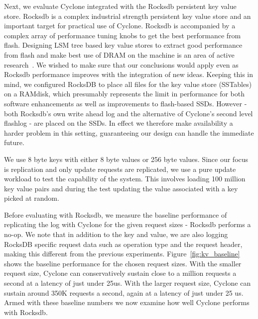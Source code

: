\documentclass[pageno]{jpaper}
\begin{document}
Next, we evaluate Cyclone integrated with the Rocksdb persistent key value
store. Rocksdb is a complex industrial strength persistent key value store and
an important target for practical use of Cyclone.  Rocksdb is accompanied by a
complex array of performance tuning knobs to get the best performance from
flash. Designing LSM tree based key value stores to extract good performance
from flash and make best use of DRAM on the machine is an area of active
research~\cite{flodb, triad}. We wished to make sure that our conclusions would
apply even as Rocksdb performance improves with the integration of new
ideas. Keeping this in mind, we configured RocksDB to place all files for the
key value store (SSTables) on a RAMdisk, which presumably represents the limit
in performance for both software enhancements as well as improvements to
flash-based SSDs. However - both Rocksdb's own write ahead log and the
alternative of Cyclone's second level flashlog - are placed on the SSDs. In
effect we therefore make availability a harder problem in this setting,
guaranteeing our design can handle the immediate future.

We use 8 byte keys with either 8 byte values or 256 byte values.  Since our
focus is replication and only update requests are replicated, we use a pure
update workload to test the capability of the system. This involves loading 100
million key value pairs and during the test updating the value associated with a
key picked at random.

Before evaluating with Rocksdb, we measure the baseline performance of
replicating the log with Cyclone for the given request sizes - Rocksdb performs
a no-op. We note that in addition to the key and value, we are also logging
RocksDB specific request data such as operation type and the request header,
making this different from the previous experiments.
Figure~\ref{fig:kv_baseline} shows the baseline performance for the chosen
request sizes. With the smaller request size, Cyclone can conservatively sustain
close to a million requests a second at a latency of just under 25us. With the
larger request size, Cyclone can sustain around 350K requests a second, again at
a latency of just under 25 us. Armed with these baseline numbers we now examine
how well Cyclone performs with Rocksdb.
\end{document}

